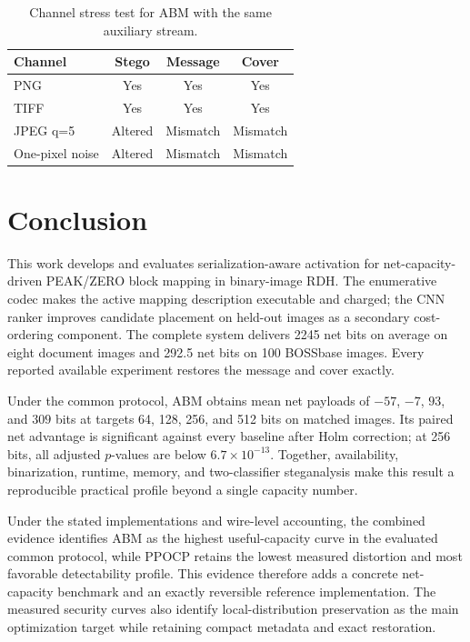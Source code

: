 \documentclass[a4paper,fleqn]{cas-dc}
\begin{document}
\begin{table}[t]
\centering
\caption{Channel stress test for ABM with the same auxiliary stream.}
\label{tab:channel-stress}
\begin{tabular}{@{}lccc@{}}
\toprule
\textbf{Channel} & \textbf{Stego} &
\textbf{Message} & \textbf{Cover} \\
\midrule
PNG & Yes & Yes & Yes \\
TIFF & Yes & Yes & Yes \\
JPEG q=5 & Altered & Mismatch & Mismatch \\
One-pixel noise & Altered & Mismatch & Mismatch \\
\bottomrule
\end{tabular}
\end{table}

\section{Conclusion}
\label{sec:conclusion}

This work develops and evaluates serialization-aware activation for
net-capacity-driven PEAK/ZERO block mapping in binary-image RDH. The
enumerative codec makes the active mapping description executable and charged;
the CNN ranker improves candidate placement on held-out images as a secondary
cost-ordering component. The complete system delivers 2245 net bits on average
on eight document images and 292.5 net bits on 100 BOSSbase images. Every
reported available experiment restores the message and cover exactly.

Under the common protocol, ABM obtains mean net payloads of $-57$, $-7$, $93$,
and $309$ bits at targets 64, 128, 256, and 512 bits on matched images. Its
paired net advantage is significant against every baseline after Holm
correction; at 256 bits, all adjusted $p$-values are below
$6.7\times10^{-13}$. Together, availability, binarization, runtime, memory,
and two-classifier steganalysis make this result a reproducible practical
profile beyond a single capacity number.

Under the stated implementations and wire-level accounting, the combined
evidence identifies ABM as the highest useful-capacity curve in the evaluated
common protocol, while PPOCP retains the lowest measured distortion and most
favorable detectability profile. This evidence therefore adds a concrete
net-capacity benchmark and an
exactly reversible reference implementation. The measured security curves
also identify local-distribution preservation as the main optimization
target while retaining compact metadata and exact restoration.
\end{document}
